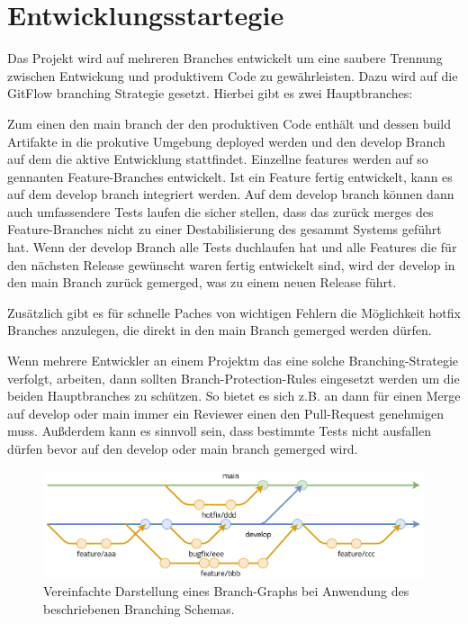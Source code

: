 \chapter{Entwicklungsstartegie}

Das Projekt wird auf mehreren Branches entwickelt um eine saubere Trennung zwischen Entwickung und produktivem Code zu gewährleisten. Dazu wird auf die GitFlow branching Strategie gesetzt. Hierbei gibt es zwei Hauptbranches: 

Zum einen den main branch der den produktiven Code enthält und dessen build Artifakte in die prokutive Umgebung deployed werden und den develop Branch auf dem die aktive Entwicklung stattfindet. Einzellne features werden auf so gennanten Feature-Branches entwickelt. Ist ein Feature fertig entwickelt, kann es auf dem develop branch integriert werden. Auf dem develop branch können dann auch umfassendere Tests laufen die sicher stellen, dass das zurück merges des Feature-Branches nicht zu einer Destabilisierung des gesammt Systems geführt hat. Wenn der develop Branch alle Tests duchlaufen hat und alle Features die für den nächsten Release gewünscht waren fertig entwickelt sind, wird der develop in den main Branch zurück gemerged, was zu einem neuen Release führt.

Zusätzlich gibt es für schnelle Paches von wichtigen Fehlern die Möglichkeit hotfix Branches anzulegen, die direkt in den main Branch gemerged werden dürfen.

Wenn mehrere Entwickler an einem Projektm das eine solche Branching-Strategie verfolgt, arbeiten, dann sollten Branch-Protection-Rules eingesetzt werden um die beiden Hauptbranches zu schützen. So bietet es sich z.B. an dann für einen Merge auf develop oder main immer ein Reviewer einen den Pull-Request genehmigen muss. Außderdem kann es sinnvoll sein, dass bestimmte Tests nicht ausfallen dürfen bevor auf den develop oder main branch gemerged wird.

\begin{figure}
    \includegraphics[scale=0.25]{res/branching_scheme.drawio.png}
    \caption{Vereinfachte Darstellung eines Branch-Graphs bei Anwendung des beschriebenen Branching Schemas.}
\end{figure}